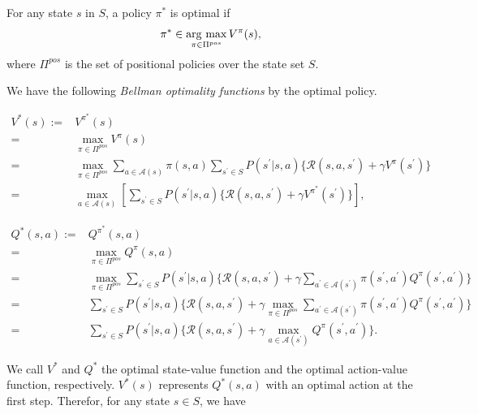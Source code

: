 \documentclass[a4j,12pt,oneside,openany,english,dvipdfmx]{jsbook}
\newcommand{\argmax}{\mathop{\rm arg~max}\limits}
\begin{document}
\begin{definition}
  For any state $s$ in $S$, a policy $\pi^{\ast}$ is optimal if
  \begin{align*}
    \pi^{\ast} \in \argmax_{\pi \in \Pi^{pos}} V^{\pi}(s),
  \end{align*}
where $\Pi^{pos}$ is the set of positional policies over the state set $S$.

We have the following {\it Bellman optimality functions} by the optimal policy.

\begin{align*}
  V^{\ast}(s) := & V^{\pi^{\ast}}(s) \\
               = & \max_{\pi \in \Pi^{pos}} V^{\pi}(s) \\
                    = & \max_{\pi \in \Pi^{pos}} \sum_{a \in \mathcal{A}(s)} \pi(s,a) \sum_{s^{\prime} \in S} P(s^{\prime}|s,a) \{ \mathcal{R}(s, a, s^{\prime}) + \gamma V^{\pi}(s^{\prime}) \} \\
                    = & \max_{a \in \mathcal{A}(s)} [ \sum_{s^{\prime} \in S} P(s^{\prime}|s,a) \{ \mathcal{R}(s, a, s^{\prime}) + \gamma V^{\pi^{\ast}}(s^{\prime}) \} ],
\end{align*}

\begin{align*}
  Q^{\ast}(s,a) := & Q^{\pi^{\ast}}(s,a) \\
                = & \max_{\pi \in \Pi^{pos}} Q^{\pi}(s,a) \\
                      = & \max_{\pi \in \Pi^{pos}} \sum_{s^{\prime} \in S} P(s^{\prime}|s,a) \{ \mathcal{R}(s, a, s^{\prime}) + \gamma \sum_{a^{\prime} \in \mathcal{A}(s^{\prime})} \pi(s^{\prime}, a^{\prime}) Q^{\pi}(s^{\prime},a^{\prime}) \} \\
                      = & \sum_{s^{\prime} \in S} P(s^{\prime}|s,a) \{ \mathcal{R}(s, a, s^{\prime}) + \gamma \max_{\pi \in \Pi^{pos}} \sum_{a^{\prime} \in \mathcal{A}(s^{\prime})} \pi(s^{\prime}, a^{\prime}) Q^{\pi}(s^{\prime},a^{\prime}) \} \\
                      = & \sum_{s^{\prime} \in S} P(s^{\prime}|s,a) \{ \mathcal{R}(s, a, s^{\prime}) + \gamma \max_{a \in \mathcal{A}(s^{\prime})} Q^{\pi}(s^{\prime},a^{\prime}) \}.
\end{align*}
\label{opt_pol}
\end{definition}

We call $V^{\ast}$ and $Q^{\ast}$ the optimal state-value function and the optimal action-value function, respectively. $V^{\ast}(s)$ represents $Q^{\ast}(s,a)$ with an optimal action at the first step. Therefor, for any state $s \in S$, we have
\end{document}
